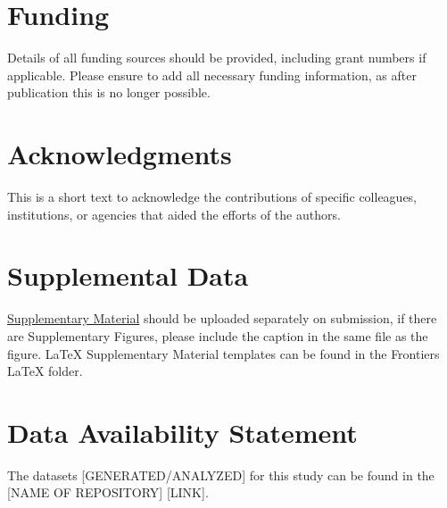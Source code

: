 \documentclass[utf8]{frontiersHLTH} %
\begin{document}
\section*{Funding}
Details of all funding sources should be provided, including grant numbers if applicable. Please ensure to add all necessary funding information, as after publication this is no longer possible.

\section*{Acknowledgments}
This is a short text to acknowledge the contributions of specific colleagues, institutions, or agencies that aided the efforts of the authors.

\section*{Supplemental Data}
 \href{http://home.frontiersin.org/about/author-guidelines#SupplementaryMaterial}{Supplementary Material} should be uploaded separately on submission, if there are Supplementary Figures, please include the caption in the same file as the figure. LaTeX Supplementary Material templates can be found in the Frontiers LaTeX folder.

\section*{Data Availability Statement}
The datasets [GENERATED/ANALYZED] for this study can be found in the [NAME OF REPOSITORY] [LINK].



\end{document}
